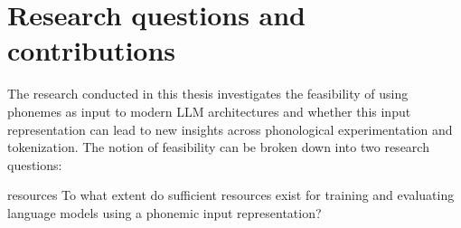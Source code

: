 














\section{Research questions and contributions}

The research conducted in this thesis investigates the feasibility of using phonemes as input to modern LLM architectures and whether this input representation can lead to new insights across phonological experimentation and tokenization. The notion of feasibility can be broken down into two research questions:

\begin{question}{}{resources}
    To what extent do sufficient resources exist for training and evaluating language models using a phonemic input representation?
\end{question}


